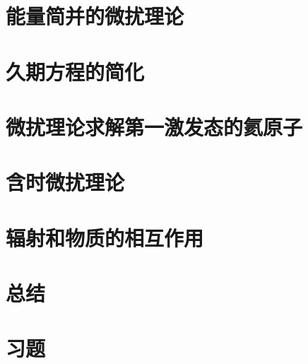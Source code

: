 \section{能量简并的微扰理论}
\label{sec:9.5 Perturbation Theory for a Degenerate Energy Level}





















\section{久期方程的简化}
\label{sec:9.6 Simplification of the Duration Equation}

\section{微扰理论求解第一激发态的氦原子}
\label{sec:9.7 Perturbation Treatment of the First Excited State of Helium}

\section{含时微扰理论}
\label{sec:9.8 Time-dependent Perturbation Theory}

\section{辐射和物质的相互作用}
\label{sec:9.9 Interaction of Radiation and Matter}

\section*{总结}

\section*{习题}